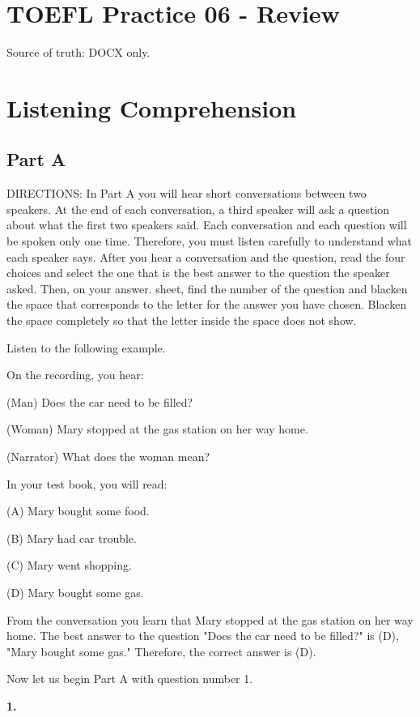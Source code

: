 \documentclass[12pt]{article}
\begin{document}
\section*{TOEFL Practice 06 - Review}
Source of truth: DOCX only.
\section*{Listening Comprehension}
\subsection*{Part A}
DIRECTIONS: In Part A you will hear short conversations between two speakers. At the end of each conversation, a third speaker will ask a question about what the first two speakers said. Each conversation and each question will be spoken only one time. Therefore, you must listen carefully to understand what each speaker says. After you hear a conversation and the question, read the four choices and select the one that is the best answer to the question the speaker asked. Then, on your answer. sheet, find the number of the question and blacken the space that corresponds to the letter for the answer you have chosen. Blacken the space completely so that the letter inside the space does not show.\par
\begin{exampleblock}
Listen to the following example.\par
On the recording, you hear:\par
(Man) Does the car need to be filled?\par
(Woman) Mary stopped at the gas station on her way home.\par
(Narrator) What does the woman mean?\par
In your test book, you will read:\par
(A) Mary bought some food.\par
(B) Mary had car trouble.\par
(C) Mary went shopping.\par
(D) Mary bought some gas.\par
From the conversation you learn that Mary stopped at the gas station on her way home. The best answer to the question "Does the car need to be filled?" is (D), "Mary bought some gas." Therefore, the correct answer is (D).\par
Now let us begin Part A with question number 1.\par
\end{exampleblock}
\noindent\textbf{1.}
\end{document}
